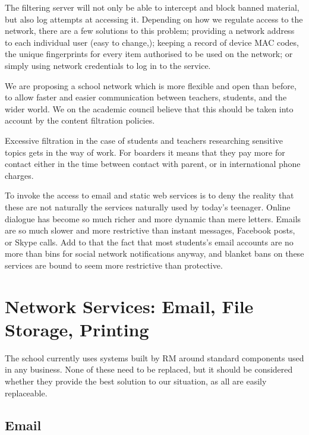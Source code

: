 \documentclass[a4paper,leqno,titlepage]{article}
\begin{document}

The filtering server will not only be able to intercept and block banned
material, but also log attempts at accessing it. Depending on how we regulate
access to the network, there are a few solutions to this problem;
providing a network address to each individual user (easy to change,);
keeping a record of device MAC codes, the unique fingerprints for every item
authorised to be used on the network;
or simply using network credentials to log in to the service.


We are proposing a school network which is more flexible and open than before,
to allow faster and easier communication between teachers, students, and the
wider world. We on the academic council believe that this should be taken into
account by the content filtration policies.


Excessive filtration in the case of students and teachers researching sensitive
topics gets in the way of work. For boarders it means that they pay more for
contact either in the time between contact with parent, or in international
phone charges.


To invoke the access to email and static web services is to deny the reality
that these are not naturally the services naturally used by today's teenager.
Online dialogue has become so much richer and more dynamic than mere letters.
Emails are so much slower and more restrictive than instant messages, Facebook
posts, or Skype calls. Add to that the fact that most students's email accounts
are no more than bins for social network notifications anyway, and blanket
bans on these services are bound to seem more restrictive than protective.






\section{Network Services: Email, File Storage, Printing}


The school currently uses systems built by RM around standard components used
in any business. None of these need to be replaced, but it should be
considered whether they provide the best solution to our situation, as all are
easily replaceable.



\subsection{Email}
\end{document}
